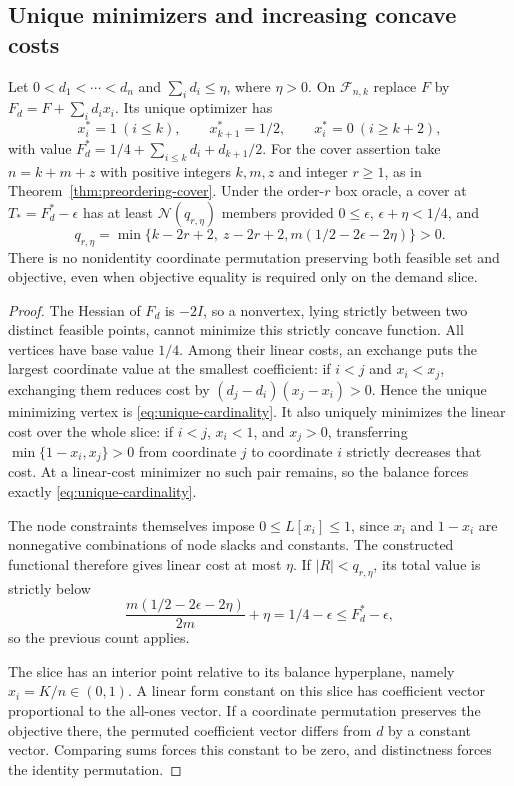 \subsection{Unique minimizers and increasing concave costs}
\begin{corollary}\label{cor:unique-cardinality}
Let $0<d_1<\cdots<d_n$ and $\sum_i d_i\le\eta$, where $\eta>0$.
On $\mathcal F_{n,k}$ replace $F$ by
$F_d=F+\sum_i d_ix_i$. Its unique optimizer has
\begin{equation}\label{eq:unique-cardinality}
 x_i^*=1\ (i\le k),\qquad x_{k+1}^*=1/2,\qquad
 x_i^*=0\ (i\ge k+2),
\end{equation}
with value $F_d^*=1/4+\sum_{i\le k}d_i+d_{k+1}/2$.
For the cover assertion take $n=k+m+z$ with positive integers $k,m,z$
and integer $r\ge1$, as in Theorem~\ref{thm:preordering-cover}.
Under the order-$r$ box oracle, a cover at
$T_*=F_d^*-\epsilon$ has at least $\mathcal N(q_{r,\eta})$ members
provided $0\le\epsilon$, $\epsilon+\eta<1/4$, and
\begin{equation}\label{eq:perturbed-qr}
 q_{r,\eta}=\min\{k-2r+2,\ z-2r+2,
                         m(1/2-2\epsilon-2\eta)\}>0.
\end{equation}
There is no nonidentity coordinate permutation preserving both feasible
set and objective, even when objective equality is required only on the
demand slice.
\end{corollary}
\begin{proof}
The Hessian of $F_d$ is $-2I$, so a nonvertex, lying strictly between
two distinct feasible points, cannot minimize this strictly concave
function. All vertices have base value $1/4$. Among their linear costs,
an exchange puts the largest coordinate value at the smallest coefficient:
if $i<j$ and $x_i<x_j$, exchanging them reduces cost by
$(d_j-d_i)(x_j-x_i)>0$. Hence the unique minimizing vertex is
\eqref{eq:unique-cardinality}. It also uniquely minimizes the linear
cost over the whole slice: if $i<j$, $x_i<1$, and $x_j>0$, transferring
$\min\{1-x_i,x_j\}>0$ from coordinate $j$ to coordinate $i$ strictly
decreases that cost. At a linear-cost minimizer no such pair remains,
so the balance forces exactly \eqref{eq:unique-cardinality}.

The node constraints themselves impose $0\le L[x_i]\le1$, since
$x_i$ and $1-x_i$ are nonnegative combinations of node slacks and
constants. The constructed functional therefore gives linear cost at
most $\eta$. If $|R|<q_{r,\eta}$, its total value is strictly below
\[
 \frac{m(1/2-2\epsilon-2\eta)}{2m}+\eta
 =1/4-\epsilon\le F_d^*-\epsilon,
\]
so the previous count applies.

The slice has an interior point relative to its balance hyperplane,
namely $x_i=K/n\in(0,1)$. A linear form constant on this slice has
coefficient vector proportional to the all-ones vector. If a coordinate
permutation preserves the objective there, the permuted coefficient
vector differs from $d$ by a constant vector. Comparing sums forces this
constant to be zero, and distinctness forces the identity permutation.
\end{proof}

